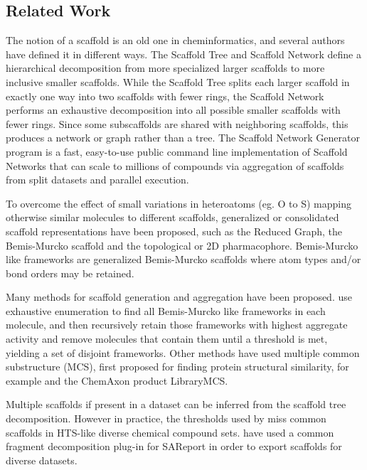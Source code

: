 \documentclass[journal=jacsat,manuscript=article]{achemso}
\begin{document}
\subsection{Related Work}
The notion of a scaffold is an old one in cheminformatics, and several authors \cite{ScaffoldRefs} have defined it in different ways. The Scaffold Tree\cite{Ertl2011ScaffoldTree} and Scaffold Network\cite{Varin2011ScafNet} define a hierarchical decomposition from more specialized larger scaffolds to more inclusive smaller scaffolds. While the Scaffold Tree splits each larger scaffold in exactly one way into two scaffolds with fewer rings, the Scaffold Network performs an exhaustive decomposition into all possible smaller scaffolds with fewer rings.  Since some subscaffolds are shared with neighboring scaffolds, this produces a network or graph rather than a tree. The Scaffold Network Generator program\cite{Matlock2013SNG} is a fast, easy-to-use public command line implementation of Scaffold Networks that can scale to millions of compounds via aggregation of scaffolds from split datasets and parallel execution. 

To overcome the effect of small variations in heteroatoms (eg. O to S) mapping 
otherwise similar molecules to different scaffolds, generalized or consolidated scaffold representations have been proposed, such as the Reduced Graph\cite{Barker2003RG}, the Bemis-Murcko scaffold\cite{BemisMurcko1996} and the topological or 2D pharmacophore\cite{Schneider1999ScafHopTP}. Bemis-Murcko like frameworks \cite{Harper2004DDclus} are generalized Bemis-Murcko scaffolds where atom types and/or bond orders may be retained.    

Many methods for scaffold generation and aggregation have been proposed.  \citeauthor{Harper2004DDclus} use exhaustive enumeration to find all Bemis-Murcko like frameworks in each molecule, and then recursively retain those frameworks with highest aggregate activity and remove molecules that contain them until a threshold is met, yielding a set of disjoint frameworks.   Other methods have used multiple common substructure (MCS), first proposed for finding protein structural similarity\cite{Koch1997MCSprot}, for example \citeauthor{Quintus2009MCS} and the ChemAxon product LibraryMCS. 

Multiple scaffolds if present in a dataset can be inferred from the scaffold tree decomposition\cite{ClarkLabute2008SAReport}. However in practice, the thresholds used by \citeauthor{ClarkLabute2008SAReport} miss common scaffolds in HTS-like diverse chemical compound sets. \citeauthor{Bandyopadhyay2011ACS} have used a common fragment decomposition plug-in for SAReport in order to export scaffolds for diverse datasets.   
\end{document}

